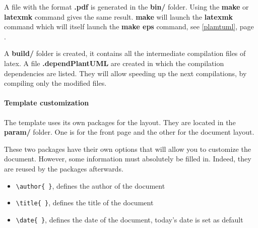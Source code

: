 A file with the format \textbf{.pdf} is generated in the \textbf{bin/} folder.
Using the \textbf{make} or \textbf{latexmk} command gives the same result.
\textbf{make} will launch the \textbf{latexmk} command which will itself launch the
\textbf{make eps} command, see \ref{plamtuml}, page \pageref{plamtuml}.\newline

A \textbf{build/} folder is created, it contains all the intermediate compilation files of
\gls{latex}. A file \textbf{.dependPlantUML} are created in which the compilation dependencies are
listed. They will allow speeding up the next compilations, by compiling only the modified files.

\paragraph{Template customization}
The template uses its own packages for the layout.
They are located in the \textbf{param/} folder.
One is for the front page and the other for the document layout.

These two packages have their own options that will allow you to customize the document.
However, some information must absolutely be filled in. Indeed, they are reused by the packages
afterwards.
\begin{itemize}
    \item \verb=\author{ }=, defines the author of the document
    \item \verb=\title{ }=, defines the title of the document
    \item \verb=\date{ }=, defines the date of the document, today's date is set as default
\end{itemize}

